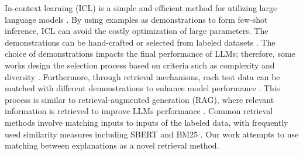 In-context learning (ICL) is a simple and efficient method for utilizing large language models \cite{brown2020gpt3}. By using examples as demonstrations to form few-shot inference, ICL can avoid the costly optimization of large parameters. The demonstrations can be hand-crafted \cite{brown2020gpt3} or selected from labeled datasets \cite{NEURIPS2022_18abbeef}. The choice of demonstrations impacts the final performance of LLMs; therefore, some works design the selection process based on criteria such as complexity and diversity \cite{fu2022complexity, li2023finding}. Furthermore, through retrieval mechanisms, each test data can be matched with different demonstrations to enhance model performance \cite{luo2023dricl}. This process is similar to retrieval-augmented generation (RAG), where relevant information is retrieved to improve LLMs performance \cite{lewis2020rag}. Common retrieval methods involve matching inputs to inputs of the labeled data, with frequently used similarity measures including SBERT and BM25 \cite{reimers2019sentencebert, hongjin2022selective, robertson2009probabilistic}. Our work attempts to use matching between explanations as a novel retrieval method.